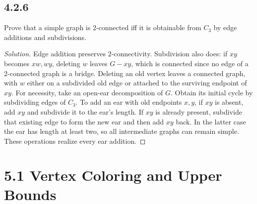 \documentclass[12pt]{amsart}
\newenvironment{solution}{\begin{proof}[Solution]}{\end{proof}}
\begin{document}
    \subsection*{4.2.6} Prove that a simple graph is $2$-connected iff it is obtainable from $C_3$ by edge additions and subdivisions.
    \begin{solution}Edge addition preserves $2$-connectivity. Subdivision also does: if $xy$ becomes $xw,wy$, deleting $w$ leaves $G-xy$, which is connected since no edge of a $2$-connected graph is a bridge. Deleting an old vertex leaves a connected graph, with $w$ either on a subdivided old edge or attached to the surviving endpoint of $xy$.
    For necessity, take an open-ear decomposition of $G$. Obtain its initial cycle by subdividing edges of $C_3$. To add an ear with old endpoints $x,y$, if $xy$ is absent, add $xy$ and subdivide it to the ear's length. If $xy$ is already present, subdivide that existing edge to form the new ear and then add $xy$ back. In the latter case the ear has length at least two, so all intermediate graphs can remain simple. These operations realize every ear addition.\end{solution}

    \section*{5.1 Vertex Coloring and Upper Bounds}
\end{document}
